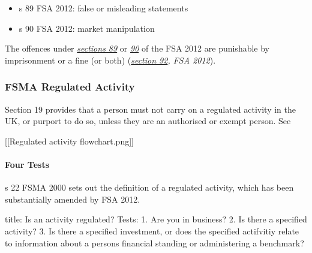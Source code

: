 \documentclass[
]{article}
\newenvironment{Shaded}{}{}
\newcommand{\NormalTok}[1]{#1}
\providecommand{\tightlist}{%
  \setlength{\itemsep}{0pt}\setlength{\parskip}{0pt}}
\begin{document}
\begin{itemize}
\tightlist
\item
  s 89 FSA 2012: false or misleading statements
\item
  s 90 FSA 2012: market manipulation
\end{itemize}

The offences under
\emph{\href{https://uk.westlaw.com/7-523-3717?originationContext=document\&transitionType=PLDocumentLink\&contextData=(sc.Default)\&ppcid=287b073fbf064422aba9bab6fbc11f1d}{sections
89}} or
\emph{\href{https://uk.westlaw.com/5-523-3718?originationContext=document\&transitionType=PLDocumentLink\&contextData=(sc.Default)\&ppcid=287b073fbf064422aba9bab6fbc11f1d}{90}}
of the FSA 2012 are punishable by imprisonment or a fine (or both)
(\emph{\href{https://uk.westlaw.com/1-523-3720?originationContext=document\&transitionType=PLDocumentLink\&contextData=(sc.Default)\&ppcid=287b073fbf064422aba9bab6fbc11f1d}{section
92}, FSA 2012}).

\hypertarget{fsma-regulated-activity}{%
\subsubsection{FSMA Regulated Activity}\label{fsma-regulated-activity}}

Section 19 provides that a person must not carry on a regulated activity
in the UK, or purport to do so, unless they are an authorised or exempt
person. See

{[}{[}Regulated activity flowchart.png{]}{]}

\hypertarget{four-tests}{%
\paragraph{Four Tests}\label{four-tests}}

s 22 FSMA 2000 sets out the definition of a regulated activity, which
has been substantially amended by FSA 2012.

\begin{Shaded}
\begin{Highlighting}[]
\NormalTok{title: Is an activity regulated?}
\NormalTok{Tests:}
\NormalTok{1. Are you in business?}
\NormalTok{2. Is there a specified activity?}
\NormalTok{3. Is there a specified investment, or does the specified actifvitiy relate to information about a person\textquotesingle{}s financial standing or administering a benchmark?}
\end{Highlighting}
\end{Shaded}
\end{document}
